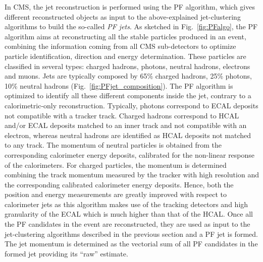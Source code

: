In CMS, the jet reconstruction is performed using the PF algorithm, which gives different reconstructed objects as input to the above-explained jet-clustering algorithms to build the so-called \textit{PF jets}.
As sketched in Fig.~\ref{fig:PFalgo}, the PF algorithm aims at reconstructing all the stable particles produced in an event, combining the information coming from all CMS sub-detectors to optimize particle identification, direction and energy determination. These particles are classified in several types: charged hadrons, photons, neutral hadrons, electrons and muons. Jets are typically composed by 65\% charged hadrons, 25\% photons, 10\% neutral hadrons (Fig.~\ref{fig:PFjet_composition}). The PF algorithm is optimized to identify all these different components inside the jet, contrary to a calorimetric-only reconstruction. Typically, photons correspond to ECAL deposits not compatible with a tracker track. Charged hadrons correspond to HCAL and/or ECAL deposits matched to an inner track and not compatible with an electron, whereas neutral hadrons are identified as HCAL deposits not matched to any track.
The momentum of neutral particles is obtained from the corresponding calorimeter energy deposits, calibrated for the non-linear response of the calorimeters.
For charged particles, the momentum is determined combining the track momentum measured by the tracker with high resolution and the corresponding calibrated calorimeter energy deposits.
Hence, both the position and energy measurements are greatly improved with respect to calorimeter jets as this algorithm makes use of the tracking detectors and high granularity of the ECAL which is much higher than that of the HCAL. Once all the PF candidates in the event are reconstructed, they are used as input to the jet-clustering algorithms described in the previous section and a PF jet is formed.
The jet momentum is determined as the vectorial sum of all PF candidates in the formed jet providing its ``raw'' estimate. 

